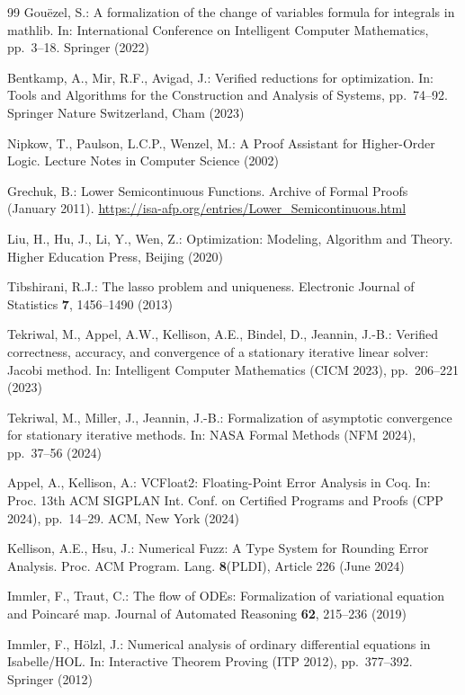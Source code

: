 \documentclass[sn-mathphys]{JORSC-jnl}%
\theoremstyle{thmstyleone}%
\theoremstyle{thmstylethree}%
\begin{document}
\begin{thebibliography}{99}
Gou{\"e}zel, S.:
A formalization of the change of variables formula for integrals in mathlib.
In: International Conference on Intelligent Computer Mathematics,
pp.~3--18. Springer (2022)

Bentkamp, A., Mir, R.F., Avigad, J.:
Verified reductions for optimization.
In: Tools and Algorithms for the Construction and Analysis of Systems,
pp.~74--92. Springer Nature Switzerland, Cham (2023)

Nipkow, T., Paulson, L.C.P., Wenzel, M.:
A Proof Assistant for Higher-Order Logic.
Lecture Notes in Computer Science (2002)

Grechuk, B.:
Lower Semicontinuous Functions.
Archive of Formal Proofs (January 2011).
\url{https://isa-afp.org/entries/Lower_Semicontinuous.html}

Liu, H., Hu, J., Li, Y., Wen, Z.:
Optimization: Modeling, Algorithm and Theory.
Higher Education Press, Beijing (2020)

Tibshirani, R.J.:
The lasso problem and uniqueness.
Electronic Journal of Statistics \textbf{7}, 1456--1490 (2013)

Tekriwal, M., Appel, A.W., Kellison, A.E., Bindel, D., Jeannin, J.-B.:
Verified correctness, accuracy, and convergence of a stationary iterative linear solver: Jacobi method.
In: Intelligent Computer Mathematics (CICM 2023), pp.~206--221 (2023)

Tekriwal, M., Miller, J., Jeannin, J.-B.:
Formalization of asymptotic convergence for stationary iterative methods.
In: NASA Formal Methods (NFM 2024), pp.~37--56 (2024)

Appel, A., Kellison, A.:
VCFloat2: Floating-Point Error Analysis in Coq.
In: Proc. 13th ACM SIGPLAN Int. Conf. on Certified Programs and Proofs (CPP 2024),
pp.~14--29. ACM, New York (2024)

Kellison, A.E., Hsu, J.:
Numerical Fuzz: A Type System for Rounding Error Analysis.
Proc. ACM Program. Lang. \textbf{8}(PLDI), Article 226 (June 2024)

Immler, F., Traut, C.:
The flow of ODEs: Formalization of variational equation and Poincar{\'e} map.
Journal of Automated Reasoning \textbf{62}, 215--236 (2019)

Immler, F., H{\"o}lzl, J.:
Numerical analysis of ordinary differential equations in Isabelle/HOL.
In: Interactive Theorem Proving (ITP 2012), pp.~377--392. Springer (2012)


\end{thebibliography}
\end{document}
